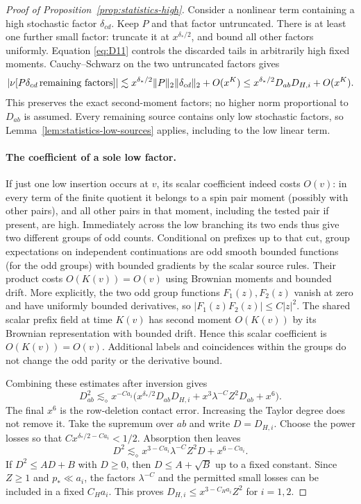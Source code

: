 \begin{proof}[Proof of Proposition~\ref{prop:statistics-high}]
Consider a nonlinear term containing a high stochastic
factor $\delta_{cd}$.  Keep $P$ and that factor untruncated.  There is
at least one further small factor: truncate it at $x^{\delta_*/2}$,
and bound all other factors uniformly.  Equation \eqref{eq:D11}
controls the discarded tails in arbitrarily high fixed moments.
Cauchy--Schwarz on the two untruncated factors gives
\[
 |\nu[P\delta_{cd}\,\hbox{remaining factors}]|
 \lesssim x^{\delta_*/2}\|P\|_2\|\delta_{cd}\|_2+O(x^K)
 \le x^{\delta_*/2}D_{ab}D_{H,i}+O(x^K).
\]
This preserves the exact second-moment factors; no higher norm
proportional to $D_{ab}$ is assumed.  Every remaining source contains
only low stochastic factors, so Lemma~\ref{lem:statistics-low-sources}
applies, including to the low linear term.

\paragraph{The coefficient of a sole low factor.}
If just one low insertion occurs at \(v\), its scalar coefficient indeed costs \(O(v)\): in every term of the finite quotient it belongs to a spin pair moment (possibly with other pairs), and all other pairs in that moment, including the tested pair if present, are high. Immediately across the low branching its two ends thus give two different groups of odd counts. Conditional on prefixes up to that cut, group expectations on independent continuations are odd smooth bounded functions (for the odd groups) with bounded gradients by the scalar source rules. Their product costs \(O(K(v))=O(v)\) using Brownian moments and bounded drift. More explicitly, the two odd group functions $F_1(z),F_2(z)$
vanish at zero and have uniformly bounded derivatives, so
$|F_1(z)F_2(z)|\le C|z|^2$.  The shared scalar prefix field at time
$K(v)$ has second moment $O(K(v))$ by its Brownian representation
with bounded drift.  Hence this scalar coefficient is $O(K(v))=O(v)$.
Additional labels and coincidences within the groups do not change
the odd parity or the derivative bound.

Combining these estimates after inversion gives
\begin{equation*}
 D_{ab}^2\lesssim_\diamond x^{-Ca_i}
       \bigl(x^{\delta_*/2}D_{ab}D_{H,i}
              +x^3\lambda^{-C}Z^2D_{ab}+x^6\bigr).
\end{equation*}
The final $x^6$ is the row-deletion contact error.  Increasing the
Taylor degree does not remove it.  Take the supremum over $ab$ and
write $D=D_{H,i}$.  Choose the power losses so that
$Cx^{\delta_*/2-Ca_i}<1/2$.  Absorption then leaves
\[
 D^2\lesssim_\diamond x^{3-Ca_i}\lambda^{-C}Z^2D
                         +x^{6-Ca_i}.
\]
If $D^2\le AD+B$ with $D\ge0$, then $D\le A+\sqrt B$ up to a fixed
constant.  Since $Z\ge1$ and $p_*\ll a_i$, the factors
$\lambda^{-C}$ and the permitted small losses can be included in a
fixed $C_Ha_i$.  This proves
$D_{H,i}\le x^{3-C_Ha_i}Z^2$ for $i=1,2$.


\end{proof}
